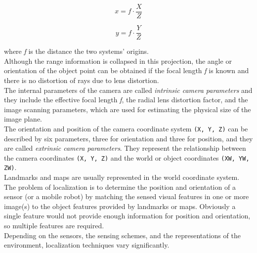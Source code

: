 \[
x = f \cdot \frac{X}{Z}
\]

\[
y = f \cdot \frac{Y}{Z}
\]

where \textit{f} is the distance the two systems' origins.
\\
Although the range information is collapsed in this projection, the angle or
orientation of the object point can be obtained if the focal length \textit{f}
is known and there is no distortion of rays due to lens distortion.
\\
The internal parameters of the camera are called \textit{intrinsic camera parameters}
and
they include the effective focal length \textit{f}, the radial lens distortion factor,
and the image scanning parameters, which are used for estimating the physical
size of the image plane.
\\
The orientation and position of the camera coordinate system \texttt{(X, Y, Z)} can be
described by six parameters, three for orientation and three for position, and
they are called \textit{extrinsic camera parameters}. They represent the relationship
between the camera coordinates \texttt{(X, Y, Z)} and the world
or object coordinates \texttt{(XW, YW, ZW)}.
\\
Landmarks and maps are usually represented in the world coordinate system.
The problem of localization is to determine the position and orientation of a
sensor (or a mobile robot) by matching the sensed visual features in one or
more image(s) to the object features provided by landmarks or maps. Obviously a
single feature would not provide enough information for position
and orientation, so multiple features are required.
\\
Depending on the sensors, the sensing schemes, and the representations of the
environment, localization techniques vary significantly.
